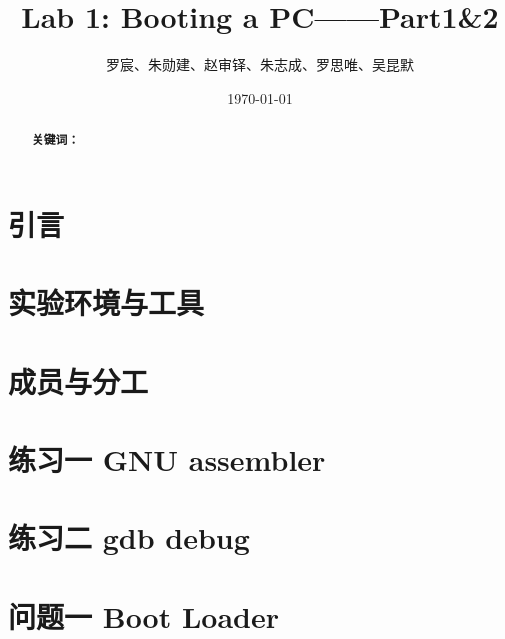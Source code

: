 \documentclass[12pt,a4paper,UTF8]{article}
\begin{document}
\title{Lab 1: Booting a PC——Part1\&2}
\author{罗宸、朱勋建、赵审铎、朱志成、罗思唯、吴昆默}
\date{\today}

\maketitle

\begin{abstract}
    \setlength{\parindent}{2em}

    \textbf{关键词：}
\end{abstract}


\section{引言}


\section{实验环境与工具}


\section{成员与分工}


\section{练习一 GNU assembler}


\section{练习二 gdb debug}


\section{问题一 Boot Loader}

    \subsection{}

    \subsection{}

    \subsection{}
\end{document}
